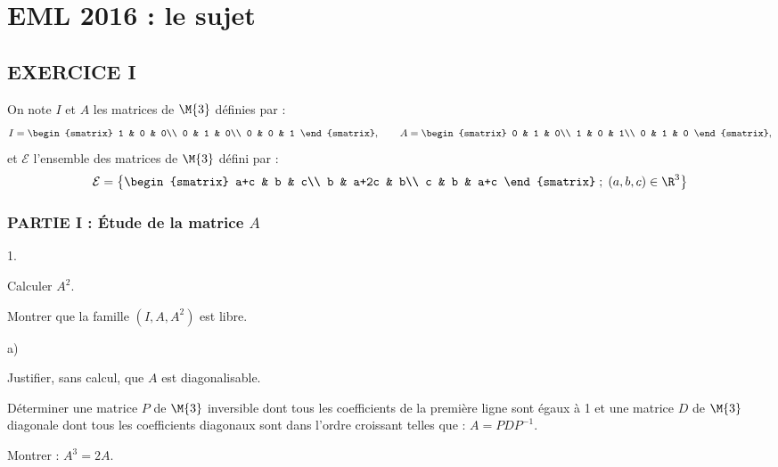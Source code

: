 \chapter*{EML 2016 : le sujet}
  
%
\vspace{1cm}

\section*{EXERCICE I}

\noindent
On note $I$ et $A$ les matrices de $\M{3}$ définies 
par :
\[
I=
\begin{smatrix}
 1 & 0 & 0\\
 0 & 1 & 0\\
 0 & 0 & 1
\end{smatrix}
, \qquad 
A=
\begin{smatrix}
 0 & 1 & 0\\
 1 & 0 & 1\\
 0 & 1 & 0
\end{smatrix},
\]
et $\mathcal{E}$ l'ensemble des matrices de $\M{3}$ 
défini par :
\[
\mathcal{E}=\left\{
\begin{smatrix}
 a+c & b & c\\
 b & a+2c & b\\
 c & b & a+c
\end{smatrix} \; ; \; (a,b,c) \in \R^3 \right\}
\]

\subsection*{PARTIE I : Étude de la matrice $A$}

\begin{noliste}{1.}
\setlength{\itemsep}{4mm}
\item Calculer $A^2$.




\item Montrer que la famille $(I,A,A^2)$ est libre.




\item
\begin{noliste}{a)}
\setlength{\itemsep}{2mm}
\item Justifier, sans calcul, que $A$ est diagonalisable.



\item Déterminer une matrice $P$ de $\M{3}$ 
inversible dont tous les coefficients de la première ligne sont égaux à 
1 et une matrice $D$ de $\M{3}$ diagonale dont tous 
les coefficients diagonaux sont dans l'ordre croissant telles que : 
$A=PDP^{-1}$.


\end{noliste}

\item Montrer : $A^3=2A$.


\end{noliste}

